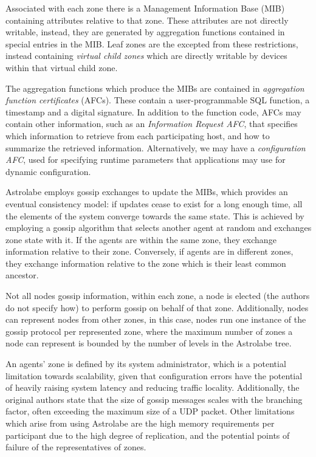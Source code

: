 Associated with each zone there is a Management Information Base (MIB) containing attributes relative to that zone. These attributes are not directly writable, instead, they are generated by aggregation functions contained in special entries in the MIB. Leaf zones are the excepted from these restrictions, instead containing \textit{virtual child zones} which are directly writable by devices within that virtual child zone.

The aggregation functions which produce the MIBs are contained in \textit{aggregation function certificates} (AFCs). These contain a user-programmable SQL function, a timestamp and a digital signature. In addition to the function code, AFCs may contain other information, such as an \textit{Information Request AFC}, that specifies which information to retrieve from each participating host, and how to summarize the retrieved information. Alternatively, we may have a \textit{configuration AFC}, used for specifying runtime parameters that applications may use for dynamic configuration.

Astrolabe employs gossip exchanges to update the MIBs, which provides an eventual consistency model: if updates cease to exist for a long enough time, all the elements of the system converge towards the same state. This is achieved by employing a gossip algorithm that selects another agent at random and exchanges zone state with it. If the agents are within the same zone, they exchange information relative to their zone. Conversely, if agents are in different zones, they exchange information relative to the zone which is their least common ancestor.

Not all nodes gossip information, within each zone, a node is elected (the authors do not specify how) to perform gossip on behalf of that zone. Additionally, nodes can represent nodes from other zones, in this case, nodes run one instance of the gossip protocol per represented zone, where the maximum number of zones a node can represent is bounded by the number of levels in the Astrolabe tree.

An agents' zone is defined by its system administrator, which is a potential limitation towards scalability, given that configuration errors have the potential of heavily raising system latency and reducing traffic locality. Additionally, the original authors state that the size of gossip messages scales with the branching factor, often exceeding the maximum size of a UDP packet. Other limitations which arise from using Astrolabe are the high memory requirements per participant due to the high degree of replication, and the potential points of failure of the representatives of zones.

